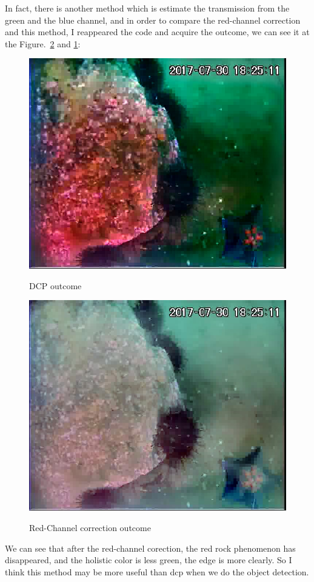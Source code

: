 \documentclass[10pt,twocolumn,letterpaper]{article}
\begin{document}
	\par In fact, there is another method which is estimate the transmission from the green and the blue channel, and in order to compare the red-channel correction and this method, I reappeared the code and acquire the outcome, we can see it at the Figure.~\ref{rc} and \ref{dcp}:
	\begin{figure}[htbp]
		\centering{}
		\includegraphics[width=0.9\linewidth]{dcp.jpg}\\
		\caption{DCP outcome}
		\label{dcp}
	\end{figure}
	\begin{figure}
		\centering{}
		\includegraphics[width=0.9\linewidth]{dcp(rc).jpg}\\
		\caption{Red-Channel correction outcome}
		\label{rc} 	
	\end{figure}
	\par We can see that after the red-channel corection, the red rock phenomenon has disappeared, and the holistic color is less green, the edge is more clearly. So I think this method may be more useful than dcp when we do the object detection.
\end{document}
